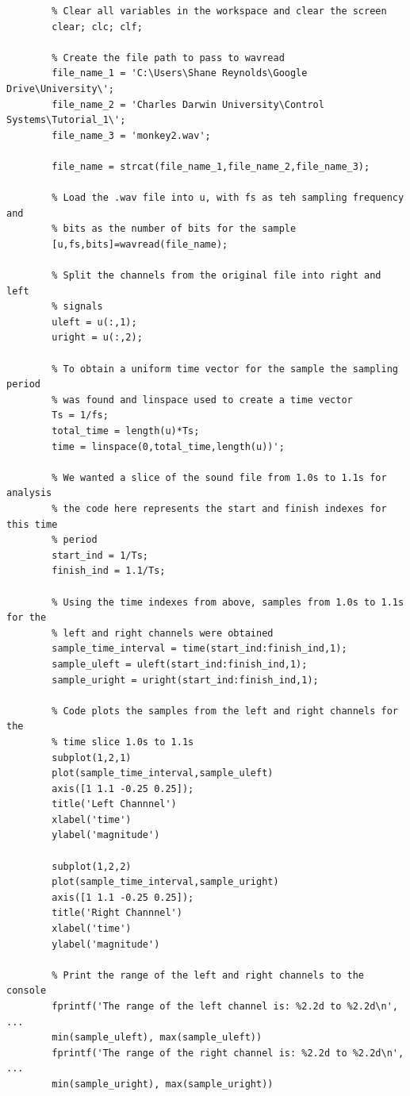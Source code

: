 \documentclass{article}
\begin{document}
    \begin{lstlisting}
	    % Clear all variables in the workspace and clear the screen
	    clear; clc; clf;
	    
	    % Create the file path to pass to wavread
	    file_name_1 = 'C:\Users\Shane Reynolds\Google Drive\University\';
	    file_name_2 = 'Charles Darwin University\Control Systems\Tutorial_1\';
	    file_name_3 = 'monkey2.wav';
	    
	    file_name = strcat(file_name_1,file_name_2,file_name_3);
	    
	    % Load the .wav file into u, with fs as teh sampling frequency and
	    % bits as the number of bits for the sample
	    [u,fs,bits]=wavread(file_name);
	    
	    % Split the channels from the original file into right and left
	    % signals
	    uleft = u(:,1);
	    uright = u(:,2);
	    
	    % To obtain a uniform time vector for the sample the sampling period
	    % was found and linspace used to create a time vector
	    Ts = 1/fs;
	    total_time = length(u)*Ts;
	    time = linspace(0,total_time,length(u))';
	    
	    % We wanted a slice of the sound file from 1.0s to 1.1s for analysis
	    % the code here represents the start and finish indexes for this time
	    % period
	    start_ind = 1/Ts;
	    finish_ind = 1.1/Ts;
	    
	    % Using the time indexes from above, samples from 1.0s to 1.1s for the
	    % left and right channels were obtained
	    sample_time_interval = time(start_ind:finish_ind,1);
	    sample_uleft = uleft(start_ind:finish_ind,1);
	    sample_uright = uright(start_ind:finish_ind,1);
	    
	    % Code plots the samples from the left and right channels for the
	    % time slice 1.0s to 1.1s
	    subplot(1,2,1)
	    plot(sample_time_interval,sample_uleft)
	    axis([1 1.1 -0.25 0.25]);
	    title('Left Channnel')
	    xlabel('time')
	    ylabel('magnitude')
	    
	    subplot(1,2,2)
	    plot(sample_time_interval,sample_uright)
	    axis([1 1.1 -0.25 0.25]);
	    title('Right Channnel')
	    xlabel('time')
	    ylabel('magnitude')
	    
	    % Print the range of the left and right channels to the console
	    fprintf('The range of the left channel is: %2.2d to %2.2d\n', ...
	    min(sample_uleft), max(sample_uleft))
	    fprintf('The range of the right channel is: %2.2d to %2.2d\n', ...
	    min(sample_uright), max(sample_uright))
    \end{lstlisting}
    
\end{document}
